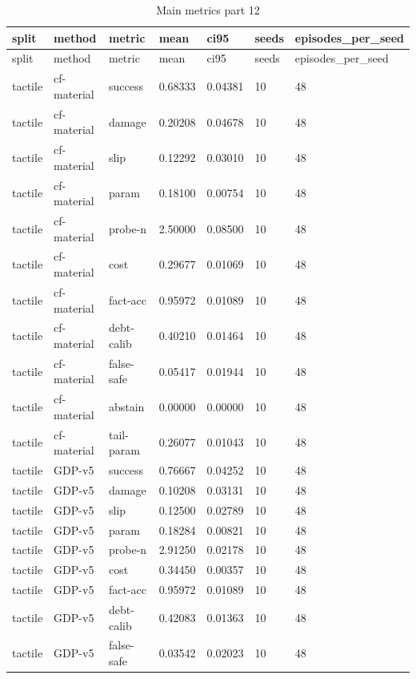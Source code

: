 \documentclass{article}
\begin{document}
\begin{center}
\tiny
\renewcommand{\arraystretch}{0.92}
\setlength{\tabcolsep}{3pt}
\begin{longtable}{lllllll}
\caption{Main metrics part 12}\label{tab:main-metrics-12}\\
\toprule
split & method & metric & mean & ci95 & seeds & episodes\_per\_seed \\
\midrule
\endfirsthead
\toprule
split & method & metric & mean & ci95 & seeds & episodes\_per\_seed \\
\midrule
\endhead
tactile & cf-material & success & 0.68333 & 0.04381 & 10 & 48 \\
tactile & cf-material & damage & 0.20208 & 0.04678 & 10 & 48 \\
tactile & cf-material & slip & 0.12292 & 0.03010 & 10 & 48 \\
tactile & cf-material & param & 0.18100 & 0.00754 & 10 & 48 \\
tactile & cf-material & probe-n & 2.50000 & 0.08500 & 10 & 48 \\
tactile & cf-material & cost & 0.29677 & 0.01069 & 10 & 48 \\
tactile & cf-material & fact-acc & 0.95972 & 0.01089 & 10 & 48 \\
tactile & cf-material & debt-calib & 0.40210 & 0.01464 & 10 & 48 \\
tactile & cf-material & false-safe & 0.05417 & 0.01944 & 10 & 48 \\
tactile & cf-material & abstain & 0.00000 & 0.00000 & 10 & 48 \\
tactile & cf-material & tail-param & 0.26077 & 0.01043 & 10 & 48 \\
tactile & GDP-v5 & success & 0.76667 & 0.04252 & 10 & 48 \\
tactile & GDP-v5 & damage & 0.10208 & 0.03131 & 10 & 48 \\
tactile & GDP-v5 & slip & 0.12500 & 0.02789 & 10 & 48 \\
tactile & GDP-v5 & param & 0.18284 & 0.00821 & 10 & 48 \\
tactile & GDP-v5 & probe-n & 2.91250 & 0.02178 & 10 & 48 \\
tactile & GDP-v5 & cost & 0.34450 & 0.00357 & 10 & 48 \\
tactile & GDP-v5 & fact-acc & 0.95972 & 0.01089 & 10 & 48 \\
tactile & GDP-v5 & debt-calib & 0.42083 & 0.01363 & 10 & 48 \\
tactile & GDP-v5 & false-safe & 0.03542 & 0.02023 & 10 & 48 \\

\end{longtable}
\end{center}
\end{document}
